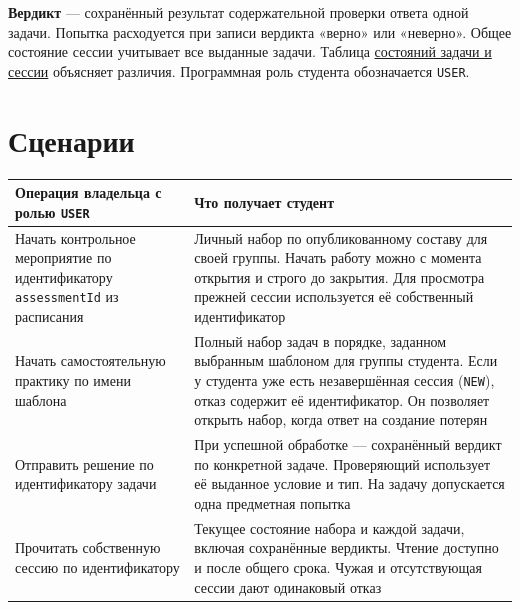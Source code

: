 \documentclass[12pt,a4paper]{article}
\begin{document}
\textbf{Вердикт} --- сохранённый результат содержательной проверки ответа одной задачи. Попытка расходуется при записи вердикта «верно» или «неверно». Общее состояние сессии учитывает все выданные задачи. Таблица {\href{../02\_Общие\_соглашения/Глоссарий.pdf\#ответ-попытка-и-состояние}{состояний задачи и сессии}} объясняет различия. Программная роль студента обозначается \texttt{USER}.

\section{Сценарии}\label{ux441ux446ux435ux43dux430ux440ux438ux438}

\hypertarget{сценарии}{}

{\def\LTcaptype{none} %
\begin{longtable}[]{@{}
  >{\raggedright\arraybackslash}p{}
  >{\raggedright\arraybackslash}p{}@{}}
\toprule\noalign{}
\begin{minipage}[b]{\linewidth}\raggedright
Операция владельца с ролью \texttt{USER}
\end{minipage} & \begin{minipage}[b]{\linewidth}\raggedright
Что получает студент
\end{minipage} \\
\midrule\noalign{}
\endhead
\bottomrule\noalign{}
\endlastfoot
Начать контрольное мероприятие по идентификатору \texttt{assessmentId} из расписания & Личный набор по опубликованному составу для своей группы. Начать работу можно с момента открытия и строго до закрытия. Для просмотра прежней сессии используется её собственный идентификатор \\
Начать самостоятельную практику по имени шаблона & Полный набор задач в порядке, заданном выбранным шаблоном для группы студента. Если у студента уже есть незавершённая сессия (\texttt{NEW}), отказ содержит её идентификатор. Он позволяет открыть набор, когда ответ на создание потерян \\
Отправить решение по идентификатору задачи & При успешной обработке --- сохранённый вердикт по конкретной задаче. Проверяющий использует её выданное условие и тип. На задачу допускается одна предметная попытка \\
Прочитать собственную сессию по идентификатору & Текущее состояние набора и каждой задачи, включая сохранённые вердикты. Чтение доступно и после общего срока. Чужая и отсутствующая сессии дают одинаковый отказ \\
\end{longtable}
}
\end{document}
